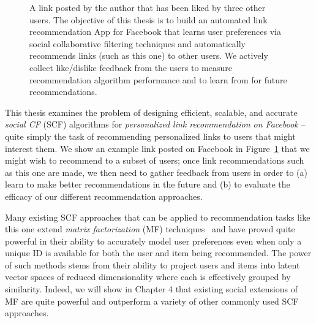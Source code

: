 \begin{figure}[t!]
\centering
\caption{A link posted by the author that has been liked by three
other users.  The objective of this thesis is to build an automated
link recommendation App for Facebook that learns user preferences
via social collaborative filtering techniques 
and automatically recommends links (such as this one) to other users.
We actively collect like/dislike feedback from the users to measure
recommendation algorithm performance and to learn from for future
recommendations.}
\label{fig:ex_link}
\end{figure}

This thesis examines the problem of designing efficient, scalable, and
accurate \emph{social CF} (SCF) algorithms for \emph{personalized link
recommendation on Facebook} -- quite simply the task of recommending
personalized links to users that might interest them.  We show an
example link posted on Facebook in Figure~\ref{fig:ex_link} that we
might wish to recommend to a subset of users; once link recommendations
such as this one are made, we then need to gather 
feedback from users in order to (a) learn to make better
recommendations in the future and (b) to evaluate the
efficacy of our different recommendation approaches.  

Many existing SCF approaches that can be applied to recommendation
tasks like this one extend \emph{matrix
factorization} (MF) techniques~\cite{pmf} and have proved quite
powerful in their ability to accurately model user preferences even
when only a unique ID is available for both the user and item being
recommended.  The power of such methods stems from their ability to
project users and items into latent vector spaces of reduced
dimensionality where each is effectively grouped by similarity.
Indeed, we will show in Chapter 4 that existing social extensions of
MF are quite powerful and outperform a variety of other commonly used
SCF approaches.

